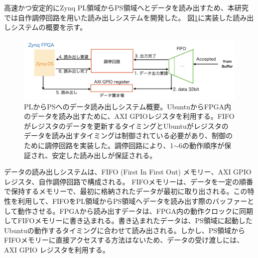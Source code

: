 


高速かつ安定的にZynq PL領域からPS領域へとデータを読み出すため、本研究では自作調停回路を用いた読み出しシステムを開発した。
図\ref{JATHubarbitor}に実装した読み出しシステムの概要を示す。

\begin{figure} 
\centering
\includegraphics[width=16cm]{fig/QAQC/JATHubarbitator.png}
\caption[PLからPSへのデータ読み出しシステム概要]{PLからPSへのデータ読み出しシステム概要。UbuntuからFPGA内のデータを読み出すために、AXI GPIOレジスタを利用する。FIFOがレジスタのデータを更新するタイミングとUbuntuがレジスタのデータを読み出すタイミングは制御されている必要があり、制御のために調停回路を実装した。調停回路により、1$\sim$6の動作順序が保証され、安定した読み出しが保証される。}
\label{JATHubarbitor}
\end{figure}

データの読み出しシステムは、FIFO (First In First Out) メモリー、AXI GPIO レジスタ、自作調停回路で構成される。
FIFOメモリーは、データを一定の順番で保持するメモリーで、最初に格納されたデータが最初に取り出される。この特性を利用して、FIFOをPL領域からPS領域へデータを読み出す際のバッファーとして動作させる。FPGAから読み出すデータは、FPGA内の動作クロックに同期してFIFOメモリーに書き込まれる。書き込まれたデータは、PS領域に起動したUbuntuの動作するタイミングに合わせて読み出される。しかし、PS領域からFIFOメモリーに直接アクセスする方法はないため、データの受け渡しには、AXI GPIO レジスタを利用する。

